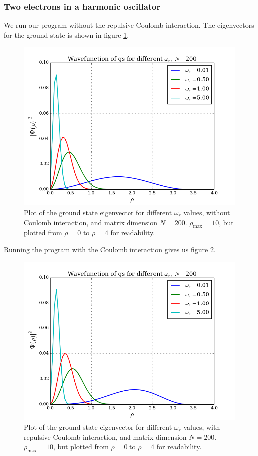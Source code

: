 \documentclass{article}
\begin{document}
\subsubsection{Two electrons in a harmonic oscillator}
We run our program without the repulsive Coulomb interaction. The eigenvectors for the ground state is shown in figure \ref{fig:eigvec_noint_200}.
\begin{figure}[H]
  \centering
  \includegraphics[scale=0.47]{../figures/eigvec_two-noint_n200.png}
  \caption{Plot of the ground state eigenvector for different $\omega_r$ values, without Coulomb interaction, and matrix dimension $N=200$. $\rho_{\text{max}} = 10$, but plotted from $\rho = 0$ to $\rho = 4$ for readability.}
  \label{fig:eigvec_noint_200}
\end{figure}
Running the program with the Coulomb interaction gives us figure \ref{fig:eigvec_int_200}.
\begin{figure}[H]
  \centering
  \includegraphics[scale=0.47]{../figures/eigvec_two-int_n200.png}
  \caption{Plot of the ground state eigenvector for different $\omega_r$ values, with repulsive Coulomb interaction, and matrix dimension $N=200$. $\rho_{\text{max}} = 10$, but plotted from $\rho = 0$ to $\rho = 4$ for readability.}
  \label{fig:eigvec_int_200}
\end{figure}
\end{document}
